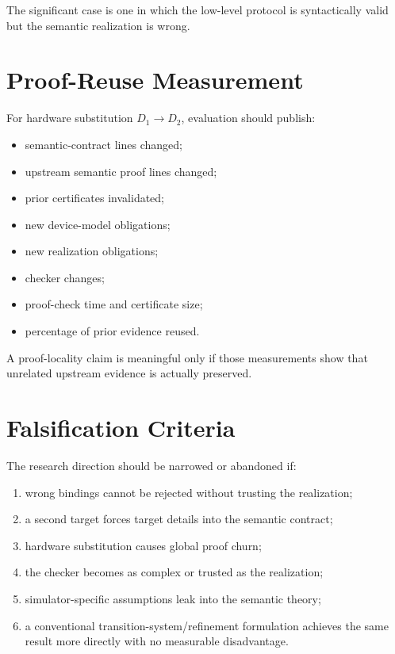 \documentclass[11pt,a4paper]{article}
\begin{document}
The significant case is one in which the low-level protocol is syntactically
valid but the semantic realization is wrong.

\section{Proof-Reuse Measurement}

For hardware substitution $D_1\rightarrow D_2$, evaluation should publish:

\begin{itemize}
\item semantic-contract lines changed;
\item upstream semantic proof lines changed;
\item prior certificates invalidated;
\item new device-model obligations;
\item new realization obligations;
\item checker changes;
\item proof-check time and certificate size;
\item percentage of prior evidence reused.
\end{itemize}

A proof-locality claim is meaningful only if those measurements show that
unrelated upstream evidence is actually preserved.

\section{Falsification Criteria}

The research direction should be narrowed or abandoned if:

\begin{enumerate}
\item wrong bindings cannot be rejected without trusting the realization;
\item a second target forces target details into the semantic contract;
\item hardware substitution causes global proof churn;
\item the checker becomes as complex or trusted as the realization;
\item simulator-specific assumptions leak into the semantic theory;
\item a conventional transition-system/refinement formulation achieves the
      same result more directly with no measurable disadvantage.
\end{enumerate}
\end{document}
